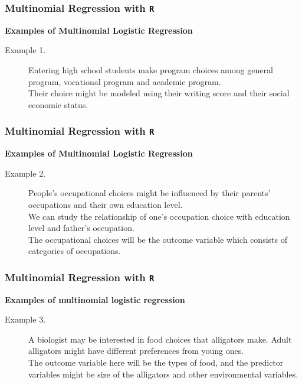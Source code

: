 \documentclass[00-GLMregslides.tex]{subfiles}
\begin{document}
\begin{frame}[fragile]
	
	\frametitle{Multinomial Regression with \texttt{R}}
	\Large
	\textbf{Examples of Multinomial Logistic Regression}
	
	\begin{description}

		
		\item[Example 1.] Entering high school students make program choices among general program, vocational program and academic program. \\ Their choice might be modeled using their writing score and their social economic status.
	\end{description}
\end{frame}
\begin{frame}[fragile]
	
	\frametitle{Multinomial Regression with \texttt{R}}
	\Large
	\textbf{Examples of Multinomial Logistic Regression}
	
	\begin{description}
		\item[Example 2.] People's occupational choices might be influenced by their parents' occupations and their own education level. \\ We can study the relationship of one's occupation choice with education level and father's occupation. \\ The occupational choices will be the outcome variable which consists of categories of occupations. 
		\end{description}
\end{frame}
\begin{frame}[fragile]

\frametitle{Multinomial Regression with \texttt{R}}
\Large
\textbf{Examples of multinomial logistic regression}

\begin{description}

\item[Example 3.] A biologist may be interested in food choices that alligators make. Adult alligators might have different preferences from young ones. \\ The outcome variable here will be the types of food, and the predictor variables might be size of the alligators and other environmental variables.
 

\end{description}
\end{frame}
\end{document}
